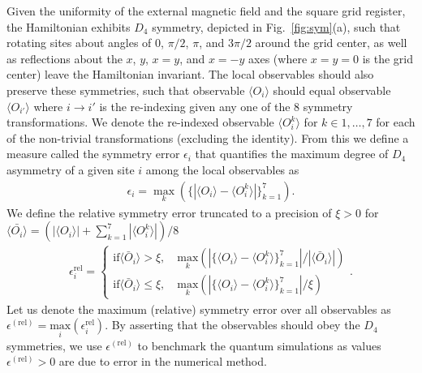 \documentclass[aps,pra,reprint,amssymb,superscriptaddress]{revtex4-2}
\begin{document}
Given the uniformity of the external magnetic field and the square grid register, the Hamiltonian exhibits $D_4$ symmetry, depicted in Fig.~\ref{fig:sym}(a), such that rotating sites about angles of $0$, $\pi/2$, $\pi$, and $3\pi/2$ around the grid center, as well as reflections about the $x$, $y$, $x=y$, and $x=-y$ axes (where $x=y=0$ is the grid center) leave the Hamiltonian invariant.
The local observables should also preserve these symmetries, such that observable $\langle O_{i}\rangle$ should equal observable $\langle O_{i'}\rangle$ where $i\rightarrow i'$ is the re-indexing given any one of the 8 symmetry
transformations.
We denote the re-indexed observable $\langle O_{i}^{k}\rangle$ for $k\in1,\dots,7$ for each of the non-trivial transformations (excluding the identity).
From this we define a measure called the symmetry error $\epsilon_i$ that quantifies the maximum degree of $D_4$ asymmetry of a given site $i$ among the local observables as
%
\begin{align}
    \epsilon_i = \max_{k}(\{|\langle O_i\rangle-\langle O_i^k\rangle|\}_{k=1}^7).
\end{align}
%
We define the relative symmetry error truncated to a precision of $\xi>0$ for $\langle \bar{O_i}\rangle=(|\langle O_i\rangle|+\sum_{k=1}^7|\langle O_i^k\rangle|)/8$
%
\begin{align}
    \epsilon^{\mathrm{rel}}_i = 
    \begin{cases}
    \mathrm{if }\langle \bar{O}_i\rangle>\xi,\quad \underset{k}{\mathrm{max}}\left(|\{\langle O_i\rangle-\langle O_i^k\rangle\}_{k=1}^7|/|\langle \bar{O}_i\rangle|\right) \\
    \mathrm{if }\langle \bar{O}_i\rangle\le\xi,\quad \underset{k}{\mathrm{max}}\left(|\{\langle O_i\rangle-\langle O_i^k\rangle\}_{k=1}^7|/\xi\right)
    \end{cases}.
\end{align}
%
Let us denote the maximum (relative) symmetry error over all observables as $\epsilon^{(\mathrm{rel})}=\underset{i}{\mathrm{max}}(\epsilon_i^{\mathrm{rel}})$.
By asserting that the observables should obey the $D_4$ symmetries, we use $\epsilon^{(\mathrm{rel})}$ to benchmark the quantum simulations as values $\epsilon^{(\mathrm{rel})}>0$ are due to error in the numerical method.
\end{document}
